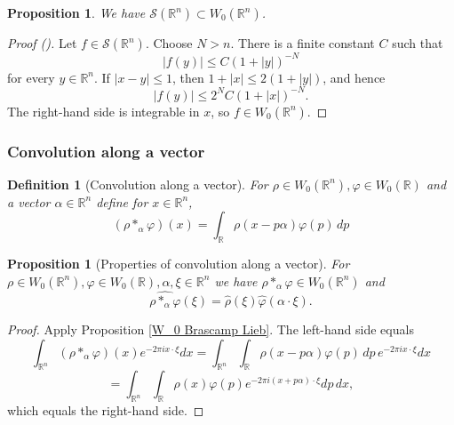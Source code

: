 \documentclass[12pt,reqno]{amsart}
\newcommand{\auto}{{({\tiny\faCar})}}
\theoremstyle{plain}
\newtheorem{proposition}[theorem]{Proposition}
\newtheorem{definition}[theorem]{Definition}
\numberwithin{equation}{section}
\theoremstyle{remark}
\newcommand{\using}[1]{}
\newcommand{\R}{{\mathbb R}}
\begin{document}
\begin{proposition}\label{P:schwartz-into-wiener}
We have $\mathcal{S}(\R^n)\subset W_0(\R^n)$.
\end{proposition}

\begin{proof}[Proof \auto]
Let $f\in\mathcal S(\R^n)$. Choose $N>n$. There is a finite constant $C$ such that
\[
|f(y)|\le C(1+|y|)^{-N}
\]
for every $y\in\R^n$. If $|x-y|\le1$, then $1+|x|\le2(1+|y|)$, and hence
\[
|f(y)|\le 2^NC(1+|x|)^{-N}.
\]
The right-hand side is integrable in $x$, so $f\in W_0(\R^n)$.
\end{proof}


\subsubsection{Convolution along a vector}


\begin{definition}[Convolution along a vector]\label{auto:convolution-along-vector-definition}
For $\rho\in W_0(\R^n), \varphi\in W_0(\R)$ and a vector $\alpha\in\mathbb{R}^n$ define for $x\in\mathbb{R}^n$,
\begin{equation}\label{auto:convolution-along-vector-formula} (\rho *_\alpha \varphi)(x) = \int_{\R} \rho(x-p\alpha) \varphi(p)\,dp \end{equation}
\end{definition}

\begin{proposition}[Properties of convolution along a vector]
\label{convolution vector}\using{W_0 Brascamp Lieb}
For $\rho \in W_0(\R^n), \varphi\in W_0(\R), \alpha,\xi\in\mathbb{R}^n$ we have $\rho *_\alpha \varphi\in W_0(\R^n)$ and
\begin{equation}\label{auto:convolution-along-vector-Fourier-transform} \widehat{\rho *_\alpha \varphi}(\xi) = \widehat{\rho}(\xi)\widehat{\varphi}(\alpha\cdot\xi). \end{equation}
\end{proposition}

\begin{proof}
Apply Proposition \ref{W_0 Brascamp Lieb}. The left-hand side equals
\[\int_{\R^n} (\rho *_\alpha \varphi)(x)e^{-2\pi ix\cdot \xi} dx=\int_{\R^n}  \int_{\R} \rho(x-p\alpha) \varphi(p)\,dp\,e^{-2\pi ix\cdot \xi} dx\]
\[=\int_{\R^n}  \int_{\R} \rho(x) \varphi(p) e^{-2\pi i (x+p\alpha)\cdot \xi} dp\,dx,\]
which equals the right-hand side.
\end{proof}
\end{document}
